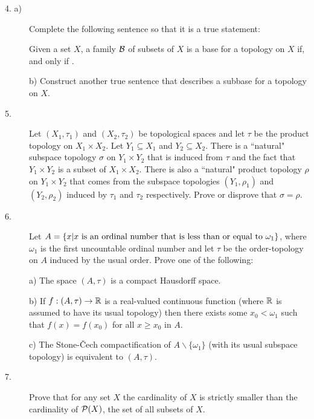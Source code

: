 \documentclass[bbb]{report}
\def\R{{\Bbb R}}
\begin{document}
\begin{Large}
\begin{description}

\item[4. a)]
Complete the following sentence so that it is a true statement:

\item[\qquad] Given a set $X$, a family ${\cal B}$ of subsets of $X$
is a base for a topology
on $X$ if, and only if \hrulefill.

\item[\quad] b)
Construct another true sentence that describes a subbase for a topology
on $X$.

\item[5.]
Let $(X_1,\tau_1)$ and $(X_2,\tau_2)$ be topological spaces and let
$\tau$ be the product topology on $X_1\times X_2$.
Let $Y_1\subseteq X_1$ and $Y_2\subseteq X_2$.
There is a ``natural" subspace topology $\sigma$ on $Y_1\times Y_2$
that is induced from $\tau$ and the fact that $Y_1\times Y_2$
is a subset of $X_1\times X_2$.
There is also a ``natural" product topology $\rho$ on $Y_1\times Y_2$
that comes from the subspace topologies $(Y_1,\rho_1)$ and $(Y_2,\rho_2)$
induced by $\tau_1$ and $\tau_2$ respectively.
Prove or disprove that $\sigma=\rho$.


\item[6.]
Let
$A=\{x|x\hbox{\ is an ordinal number that is less than or equal to }\omega_1\}$,
where $\omega_1$ is the first uncountable ordinal number
and let $\tau$ be the order-topology on $A$ induced by the usual order.
Prove one of the following:


\item[\quad] a)
The space $(A,\tau)$ is a compact Hausdorff space.

\item[\quad] b)
If $f:(A,\tau)\to \R$ is a real-valued continuous function
(where $\R$ is assumed to have its usual topology)
then there exists some
$x_0<\omega_1$ such that $f(x)=f(x_0)$ for all $x\geq x_0$ in $A$.

\item[\quad] c)
The Stone-\v Cech compactification of $A\backslash \{\omega_1\}$
(with its usual subspace topology) is
equivalent to $(A,\tau)$.


\item[7.]
Prove that for any set $X$ the cardinality of $X$ is strictly smaller
than the cardinality of ${\cal P}(X)$, the set of all subsets of $X$.


\end{description}
\end{Large}
\end{document}
